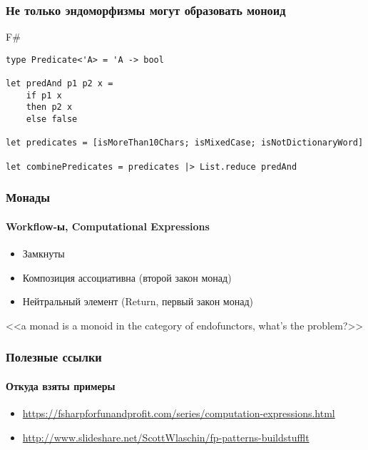 \documentclass[xetex,mathserif,serif]{beamer}
\begin{document}
	\begin{frame}[fragile]
		\frametitle{Не только эндоморфизмы могут образовать моноид}
   		\begin{exampleblock}{F\#}
   			\begin{lstlisting}
type Predicate<'A> = 'A -> bool

let predAnd p1 p2 x = 
    if p1 x 
    then p2 x
    else false
    
let predicates = [isMoreThan10Chars; isMixedCase; isNotDictionaryWord]

let combinePredicates = predicates |> List.reduce predAnd
\end{lstlisting}
\end{exampleblock}
\end{frame}

	\begin{frame}
		\frametitle{Монады}
		\framesubtitle{Workflow-ы, Computational Expressions}
		\begin{itemize}
    		\item Замкнуты
    		\item Композиция ассоциативна (второй закон монад)
    		\item Нейтральный элемент (Return, первый закон монад)
		\end{itemize}
		<<a monad is a monoid in the category of endofunctors, what's the problem?>>
    \end{frame}

	\begin{frame}
		\frametitle{Полезные ссылки}
		\framesubtitle{Откуда взяты примеры}
		\begin{small}
    		\begin{itemize}
        		\item \url{https://fsharpforfunandprofit.com/series/computation-expressions.html}
        		\item \url{http://www.slideshare.net/ScottWlaschin/fp-patterns-buildstufflt}
    		\end{itemize}
		\end{small}
    \end{frame}
	
\end{document}
